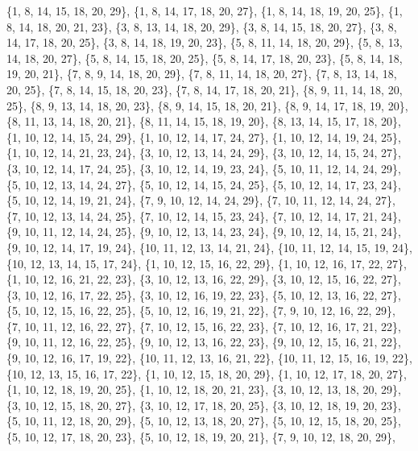 \documentclass[11pt,a4paper]{article}
\begin{document}
{\{1, 8, 14, 15, 18, 20, 29\}, \{1, 8, 14, 17, 18, 20, 27\}, \{1, 8, 14, 18, 19, 20, 25\}, \{1, 8, 14, 18, 20, 21, 23\}, \{3, 8, 13, 14, 18, 20, 29\},
\{3, 8, 14, 15, 18, 20, 27\}, \{3, 8, 14, 17, 18, 20, 25\}, \{3, 8, 14, 18, 19, 20, 23\}, \{5, 8, 11, 14, 18, 20, 29\}, \{5, 8, 13, 14, 18, 20, 27\},
\{5, 8, 14, 15, 18, 20, 25\}, \{5, 8, 14, 17, 18, 20, 23\}, \{5, 8, 14, 18, 19, 20, 21\}, \{7, 8, 9, 14, 18, 20, 29\}, \{7, 8, 11, 14, 18, 20, 27\},
\{7, 8, 13, 14, 18, 20, 25\}, \{7, 8, 14, 15, 18, 20, 23\}, \{7, 8, 14, 17, 18, 20, 21\}, \{8, 9, 11, 14, 18, 20, 25\}, \{8, 9, 13, 14, 18, 20, 23\},
\{8, 9, 14, 15, 18, 20, 21\}, \{8, 9, 14, 17, 18, 19, 20\}, \{8, 11, 13, 14, 18, 20, 21\}, \{8, 11, 14, 15, 18, 19, 20\}, \{8, 13, 14, 15, 17, 18, 20\},
\{1, 10, 12, 14, 15, 24, 29\}, \{1, 10, 12, 14, 17, 24, 27\}, \{1, 10, 12, 14, 19, 24, 25\}, \{1, 10, 12, 14, 21, 23, 24\}, \{3, 10, 12, 13, 14, 24, 29\},
\{3, 10, 12, 14, 15, 24, 27\}, \{3, 10, 12, 14, 17, 24, 25\}, \{3, 10, 12, 14, 19, 23, 24\}, \{5, 10, 11, 12, 14, 24, 29\}, \{5, 10, 12, 13, 14, 24, 27\},
\{5, 10, 12, 14, 15, 24, 25\}, \{5, 10, 12, 14, 17, 23, 24\}, \{5, 10, 12, 14, 19, 21, 24\}, \{7, 9, 10, 12, 14, 24, 29\}, \{7, 10, 11, 12, 14, 24, 27\},
\{7, 10, 12, 13, 14, 24, 25\}, \{7, 10, 12, 14, 15, 23, 24\}, \{7, 10, 12, 14, 17, 21, 24\}, \{9, 10, 11, 12, 14, 24, 25\}, \{9, 10, 12, 13, 14, 23, 24\},
\{9, 10, 12, 14, 15, 21, 24\}, \{9, 10, 12, 14, 17, 19, 24\}, \{10, 11, 12, 13, 14, 21, 24\}, \{10, 11, 12, 14, 15, 19, 24\}, \{10, 12, 13, 14, 15, 17, 24\},
\{1, 10, 12, 15, 16, 22, 29\}, \{1, 10, 12, 16, 17, 22, 27\}, \{1, 10, 12, 16, 21, 22, 23\}, \{3, 10, 12, 13, 16, 22, 29\}, \{3, 10, 12, 15, 16, 22, 27\},
\{3, 10, 12, 16, 17, 22, 25\}, \{3, 10, 12, 16, 19, 22, 23\}, \{5, 10, 12, 13, 16, 22, 27\}, \{5, 10, 12, 15, 16, 22, 25\}, \{5, 10, 12, 16, 19, 21, 22\},
\{7, 9, 10, 12, 16, 22, 29\}, \{7, 10, 11, 12, 16, 22, 27\}, \{7, 10, 12, 15, 16, 22, 23\}, \{7, 10, 12, 16, 17, 21, 22\}, \{9, 10, 11, 12, 16, 22, 25\},
\{9, 10, 12, 13, 16, 22, 23\}, \{9, 10, 12, 15, 16, 21, 22\}, \{9, 10, 12, 16, 17, 19, 22\}, \{10, 11, 12, 13, 16, 21, 22\}, \{10, 11, 12, 15, 16, 19, 22\},
\{10, 12, 13, 15, 16, 17, 22\}, \{1, 10, 12, 15, 18, 20, 29\}, \{1, 10, 12, 17, 18, 20, 27\}, \{1, 10, 12, 18, 19, 20, 25\}, \{1, 10, 12, 18, 20, 21, 23\},
\{3, 10, 12, 13, 18, 20, 29\}, \{3, 10, 12, 15, 18, 20, 27\}, \{3, 10, 12, 17, 18, 20, 25\}, \{3, 10, 12, 18, 19, 20, 23\}, \{5, 10, 11, 12, 18, 20, 29\},
\{5, 10, 12, 13, 18, 20, 27\}, \{5, 10, 12, 15, 18, 20, 25\}, \{5, 10, 12, 17, 18, 20, 23\}, \{5, 10, 12, 18, 19, 20, 21\}, \{7, 9, 10, 12, 18, 20, 29\},
}
\end{document}
